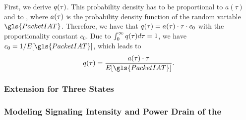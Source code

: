 First, we derive \(q(\tau)\). 
This probability density has to be proportional to $a(\tau)$ and to \ObservationIntervalLength, where $a(\tau)$ is the probability density function of the random variable \(\gls{PacketIAT}\). 
Therefore, we have that $q(\tau)=a(\tau)\cdot\tau\cdot c_0$ with the proportionality constant $c_0$.\tabularnewline
Due to $\int_0^\infty q(\tau)d\tau=1$, we have $c_0=1/E[\gls{PacketIAT}]$, which leads to
\begin{equation}
\ObservationIntervalDensity(\ObservationIntervalLength)=\frac{a(\ObservationIntervalLength) \cdot \ObservationIntervalLength}{E[\gls{PacketIAT}]}.
\label{eq::pdensObservation}
\end{equation}


\subsubsection*{Extension for Three  States}\label{sec:network:performance_model:system_description:three_states}
\subsubsection*{Modeling Signaling Intensity and Power Drain of the }\label{sec:network:performance_model:system_description:metrics}